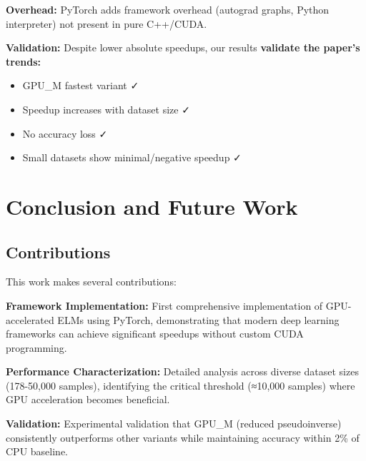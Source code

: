 \documentclass[conference]{IEEEtran}
\begin{document}
\textbf{Overhead:} PyTorch adds framework overhead (autograd graphs, Python interpreter) not present in pure C++/CUDA.

\textbf{Validation:} Despite lower absolute speedups, our results \textbf{validate the paper's trends:}
\begin{itemize}
\item GPU\_M fastest variant ✓
\item Speedup increases with dataset size ✓
\item No accuracy loss ✓
\item Small datasets show minimal/negative speedup ✓
\end{itemize}

\section{Conclusion and Future Work}
\label{sec:conclusion}

\subsection{Contributions}

This work makes several contributions:

\textbf{Framework Implementation:} First comprehensive implementation of GPU-accelerated ELMs using PyTorch, demonstrating that modern deep learning frameworks can achieve significant speedups without custom CUDA programming.

\textbf{Performance Characterization:} Detailed analysis across diverse dataset sizes (178-50,000 samples), identifying the critical threshold (≈10,000 samples) where GPU acceleration becomes beneficial.

\textbf{Validation:} Experimental validation that GPU\_M (reduced pseudoinverse) consistently outperforms other variants while maintaining accuracy within 2\% of CPU baseline.
\end{document}

